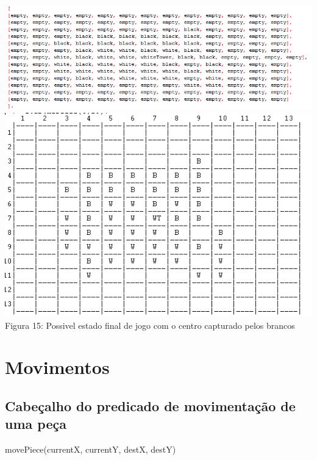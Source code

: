 \documentclass[a4paper]{article}
\begin{document}
\begin{center}
\hspace*{-2cm}\includegraphics[scale=0.85]{gameex3rep.png}\linebreak\linebreak
 \includegraphics[scale=0.9]{gameex3.png}\linebreak
Figura 15: Possivel estado final de jogo com o centro capturado pelos brancos \linebreak\linebreak
\end{center}


\newpage
\section{Movimentos}
\subsection{Cabeçalho do predicado de movimentação de uma peça}
movePiece(currentX, currentY, destX, destY)
\end{document}
